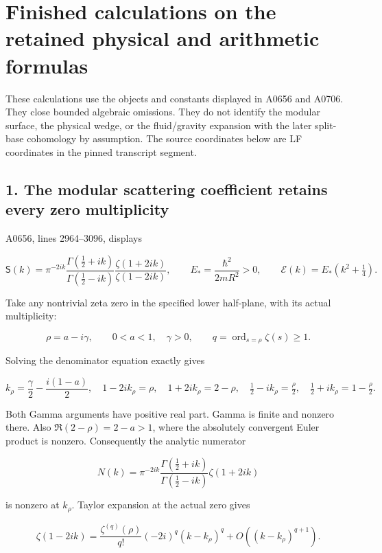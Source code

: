 \section{Finished calculations on the retained physical and arithmetic
formulas}\label{TranscriptStage:proof10:finished-calculations-on-the-retained-physical-and-arithmetic-formulas}

These calculations use the objects and constants displayed in A0656 and
A0706. They close bounded algebraic omissions. They do not identify the
modular surface, the physical wedge, or the fluid/gravity expansion with
the later split-base cohomology by assumption. The source coordinates
below are LF coordinates in the pinned transcript segment.

\subsection{1. The modular scattering coefficient retains every zero
multiplicity}\label{TranscriptStage:proof10:the-modular-scattering-coefficient-retains-every-zero-multiplicity}

A0656, lines 2964--3096, displays

\[
\mathsf S(k)=\pi^{-2ik}
\frac{\Gamma(\frac12+ik)}{\Gamma(\frac12-ik)}
\frac{\zeta(1+2ik)}{\zeta(1-2ik)},
\qquad E_* = \frac{\hbar^2}{2mR^2}>0,
\qquad \mathcal E(k)=E_*(k^2+\tfrac14).
\]

Take any nontrivial zeta zero in the specified lower half-plane, with
its actual multiplicity:

\[
\rho=a-i\gamma,\qquad 0<a<1,\quad\gamma>0,
\qquad q=\operatorname{ord}_{s=\rho}\zeta(s)\ge1.
\]

Solving the denominator equation exactly gives

\[
k_\rho=\frac\gamma2-\frac{i(1-a)}2,
\quad 1-2ik_\rho=\rho,
\quad 1+2ik_\rho=2-\rho,
\quad \tfrac12-ik_\rho=\tfrac\rho2,
\quad \tfrac12+ik_\rho=1-\tfrac\rho2.
\]

Both Gamma arguments have positive real part. Gamma is finite and
nonzero there. Also \(\Re(2-\rho)=2-a>1\), where the absolutely
convergent Euler product is nonzero. Consequently the analytic numerator

\[
N(k)=\pi^{-2ik}
\frac{\Gamma(\frac12+ik)}{\Gamma(\frac12-ik)}\zeta(1+2ik)
\]

is nonzero at \(k_\rho\). Taylor expansion at the actual zero gives

\[
\zeta(1-2ik)
=\frac{\zeta^{(q)}(\rho)}{q!}(-2i)^q(k-k_\rho)^q
+O((k-k_\rho)^{q+1}).
\]

